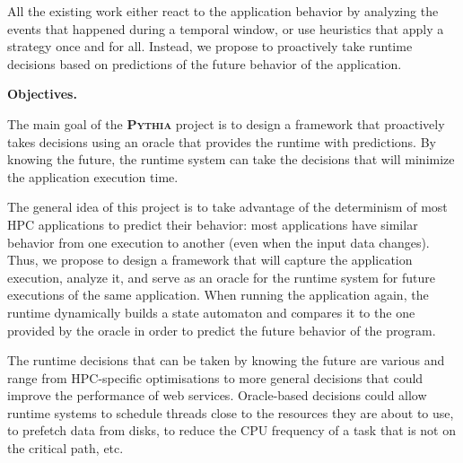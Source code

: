 \documentclass[a4paper,11pt,defblank]{article}
\newcommand{\pname}{\textsc{Pythia}\xspace}
\begin{document}
All the existing work either react to the application behavior by
analyzing the events that happened during a temporal window, or use
heuristics that apply a strategy once and for all. Instead, we
propose to proactively take runtime decisions based on predictions of
the future behavior of the application.


\textbf{Objectives.}

The main goal of the \textbf{\pname} project is to design a framework
that proactively takes decisions using an oracle that provides the
runtime with predictions. By knowing the future, the runtime system
can take the decisions that will minimize the application execution
time.

The general idea of this project is to take advantage of the
determinism of most HPC applications to predict their behavior: most
applications have similar behavior from one execution to another (even
when the input data changes). Thus, we propose to design a framework
that will capture the application execution, analyze it, and serve as
an oracle for the runtime system for future executions of the same
application. When running the application again, the runtime
dynamically builds a state automaton and compares it to the one
provided by the oracle in order to predict the future behavior of the
program.

The runtime decisions that can be taken by knowing the future are
various and range from HPC-specific optimisations to more general
decisions that could improve the performance of web
services. Oracle-based decisions could allow runtime systems to
schedule threads close to the resources they are about to use, to
prefetch data from disks, to reduce the CPU frequency of a task that
is not on the critical path, etc.
\end{document}
